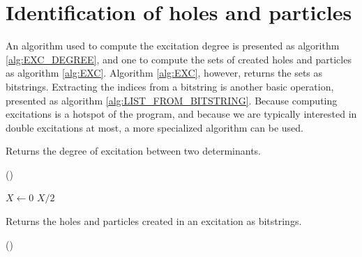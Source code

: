 \documentclass[./thesis.tex]{subfiles}
\begin{document}
\section{Identification of holes and particles}
\label{sec:det_exc}

An algorithm used to compute the excitation degree is presented as algorithm \ref{alg:EXC_DEGREE}, and one to compute the sets of created holes and particles as algorithm \ref{alg:EXC}. Algorithm \ref{alg:EXC}, however, returns the sets as bitstrings. Extracting the indices from a bitstring is another basic operation, presented as algorithm \ref{alg:LIST_FROM_BITSTRING}.
Because computing excitations is a hotspot of the program, and because we are typically interested in double excitations at most, a more specialized algorithm can be used.\cite{Scemama_2013}


\begin{algorithm}[h!]
	\caption{Returns the degree of excitation between two determinants.}
	\label{alg:EXC_DEGREE}
	
	\Fn(){}{

		$X \gets 0$   \;
		\KwRet $X / 2$\;
	}
\end{algorithm}


\begin{algorithm}[H]
	\caption{Returns the holes and particles created in an excitation as bitstrings.}
		
	\label{alg:EXC}
	
	\Fn(){}{
		\;
		}
\end{algorithm}
\end{document}
